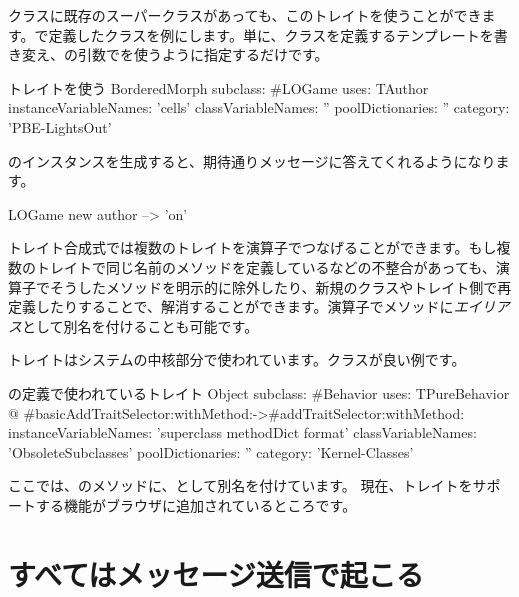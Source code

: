 \documentclass[a4paper,10pt,twoside]{book}
\begin{document}
\noindent
クラスに既存のスーパークラスがあっても、このトレイトを使うことができます。で定義したクラスを例にします。単に、クラスを定義するテンプレートを書き変え、の引数でを使うように指定するだけです。

\begin{classdef}[sbegamewithtrait]{トレイトを使う}
BorderedMorph subclass: #LOGame
	uses: TAuthor
	instanceVariableNames: 'cells'
	classVariableNames: ''
	poolDictionaries: ''
	category: 'PBE-LightsOut'
\end{classdef}

のインスタンスを生成すると、期待通りメッセージに答えてくれるようになります。

\begin{code}{}
LOGame new author --> 'on'
\end{code}

トレイト合成式では複数のトレイトを\ct{+}演算子でつなげることができます。もし複数のトレイトで同じ名前のメソッドを定義しているなどの不整合があっても、\ct{-}演算子でそうしたメソッドを明示的に除外したり、新規のクラスやトレイト側で再定義したりすることで、解消することができます。演算子でメソッドに\emph{エイリアス}として別名を付けることも可能です。

トレイトはシステムの中核部分で使われています。\mbox{}クラスが良い例です。

\begin{classdef}[behaviorwithtraits]{の定義で使われているトレイト}
Object subclass: #Behavior
	uses: TPureBehavior @ {#basicAddTraitSelector:withMethod:->#addTraitSelector:withMethod:}
	instanceVariableNames: 'superclass methodDict format'
	classVariableNames: 'ObsoleteSubclasses'
	poolDictionaries: ''
	category: 'Kernel-Classes'
\end{classdef}
\noindent
ここでは、のメソッドに、として別名を付けています。
現在、トレイトをサポートする機能がブラウザに追加されているところです。


\section{すべてはメッセージ送信で起こる}

\end{document}
